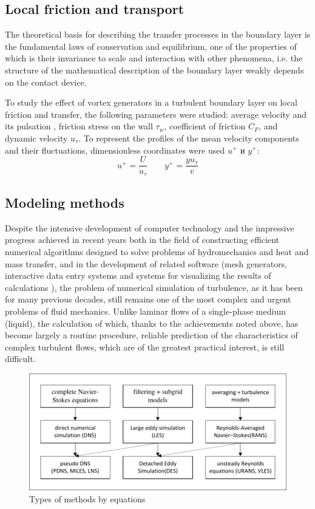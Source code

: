 \subsection{Local friction and transport}
	The theoretical basis for describing the transfer processes in the boundary layer is the fundamental laws of conservation and equilibrium, one of the properties of which is their invariance to scale and interaction with other phenomena, i.e. the structure of the mathematical description of the boundary layer weakly depends on the contact device.
	
	To study the effect of vortex generators in a turbulent boundary layer on local friction and transfer, the following parameters were studied: average velocity and its pulsation , friction stress on the wall $\tau_w$, coefficient of friction $C_F$, and dynamic velocity $u_\tau$. To represent the profiles of the mean velocity components and their fluctuations, dimensionless coordinates were used $u^+$ и $y^+$:
	\begin{equation}
		u^+ = \frac{U}{u_\tau} \qquad y^+ = \frac{yu_\tau}{v}
	\end{equation}

\subsection{Modeling methods}
	Despite the intensive development of computer technology and the impressive progress achieved in recent years both in the field of constructing efficient numerical algorithms designed to solve problems of hydromechanics and heat and mass transfer, and in the development of related software (mesh generators, interactive data entry systems and systems for visualizing the results of calculations ), the problem of numerical simulation of turbulence, as it has been for many previous decades, still remains one of the most complex and urgent problems of fluid mechanics. Unlike laminar flows of a single-phase medium (liquid), the calculation of which, thanks to the achievements noted above, has become largely a routine procedure, reliable prediction of the characteristics of complex turbulent flows, which are of the greatest practical interest, is still difficult.
	\begin{figure}[H]
		\centering
		\includegraphics[width=0.9\linewidth]{../Assets/СхемаМетодовEN}
		\caption{\footnotesize{Types of methods by equations}}
		\label{fig:cheme}
	\end{figure}
	
